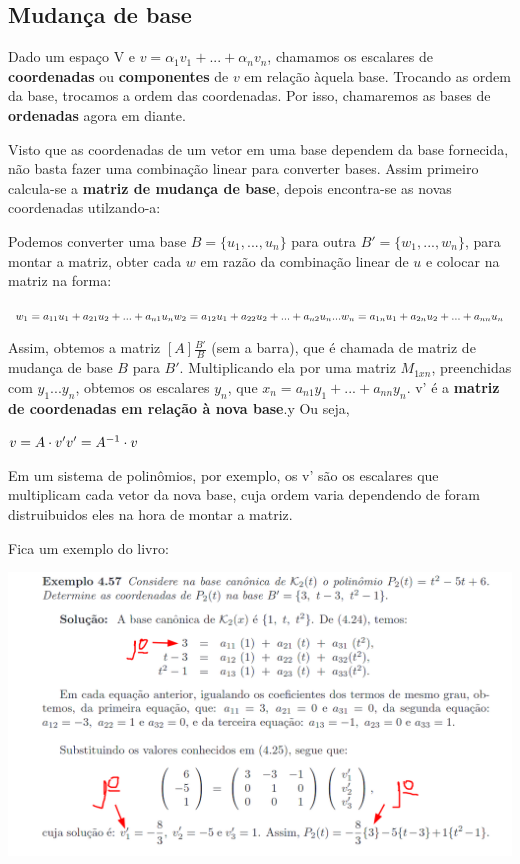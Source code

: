 \documentclass[letterpaper, 11pt]{article}
\begin{document}
\subsection{Mudança de base}
\label{sec:org165d1da}
Dado um espaço V e \(v = \alpha_1v_1 + ... + \alpha_nv_n\), chamamos os escalares de \textbf{coordenadas} ou \textbf{componentes} de \(v\) em relação àquela base. Trocando as ordem da base, trocamos a ordem das coordenadas.
Por isso, chamaremos as bases de \textbf{ordenadas} agora em diante.

Visto que as coordenadas de um vetor em uma base dependem da base fornecida, não basta fazer uma combinação linear para converter bases. Assim primeiro calcula-se a \textbf{matriz de mudança de base}, depois encontra-se as novas coordenadas utilzando-a:

Podemos converter uma base \(B = \{u_1,...,u_n\}\) para outra \(B' =\{w_1,...,w_n\}\), para montar a matriz, obter cada \(w\) em razão da combinação linear de \(u\) e colocar na matriz na forma:

\begin{center} $w_1 = a_{11}u_1 + a_{21}u_2 + ... + a_{n1}u_n \\ w_2 = a_{12}u_1 + a_{22}u_2 + ... + a_{n2}u_n \\ ... \\ w_n = a_{1n}u_1 + a_{2n}u_2 + ... + a_{nn}u_n$ \end{center}

Assim, obtemos a matriz \([A]\frac{B'}{B}\) (sem a barra), que é chamada de matriz de mudança de base \(B\) para \(B'\). Multiplicando ela por uma matriz \(M_{1xn}\), preenchidas com \(y_1...y_n\), obtemos os escalares
\(y_n\), que \(x_n = a_{n1}y_1 + ... + a_{nn}y_{n}\). v' é a \textbf{matriz de coordenadas em relação à nova base}.y
Ou seja,
\begin{center} $v = A \cdot v' \\ v' = A^{-1} \cdot v$ \end{center}

Em um sistema de polinômios, por exemplo, os v' são os escalares que multiplicam cada vetor da nova base, cuja ordem varia dependendo de foram distruibuidos eles na hora de montar a matriz.

Fica um exemplo do livro:

\begin{center}
\includegraphics[width=.9\linewidth]{./img/polibase.png}
\end{center}
\end{document}
